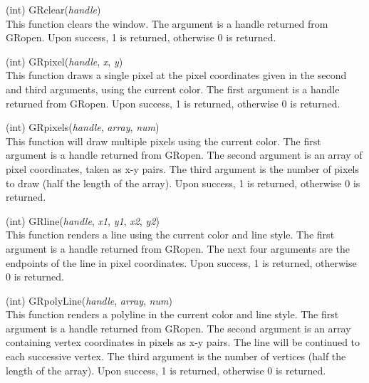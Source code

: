 \begin{description}
\item{(int) \vt GRclear({\it handle\/})}\\
This function clears the window.  The argument is a handle returned
from {\vt GRopen}.  Upon success, 1 is returned, otherwise 0 is
returned.

\item{(int) \vt GRpixel({\it handle}, {\it x}, {\it y\/})}\\
This function draws a single pixel at the pixel coordinates given in
the second and third arguments, using the current color.  The first
argument is a handle returned from {\vt GRopen}.  Upon success, 1 is
returned, otherwise 0 is returned.

\item{(int) \vt GRpixels({\it handle}, {\it array}, {\it num\/})}\\
This function will draw multiple pixels using the current color.  The
first argument is a handle returned from {\vt GRopen}.  The second
argument is an array of pixel coordinates, taken as x-y pairs.  The
third argument is the number of pixels to draw (half the length of the
array).  Upon success, 1 is returned, otherwise 0 is returned.

\item{(int) \vt GRline({\it handle}, {\it x1}, {\it y1}, {\it x2},
  {\it y2\/})}\\
This function renders a line using the current color and line style. 
The first argument is a handle returned from {\vt GRopen}.  The next
four arguments are the endpoints of the line in pixel coordinates. 
Upon success, 1 is returned, otherwise 0 is returned.

\item{(int) \vt GRpolyLine({\it handle}, {\it array}, {\it num\/})}\\
This function renders a polyline in the current color and line style. 
The first argument is a handle returned from {\vt GRopen}.  The second
argument is an array containing vertex coordinates in pixels as x-y
pairs.  The line will be continued to each successive vertex.  The
third argument is the number of vertices (half the length of the
array).  Upon success, 1 is returned, otherwise 0 is returned.


\end{description}
